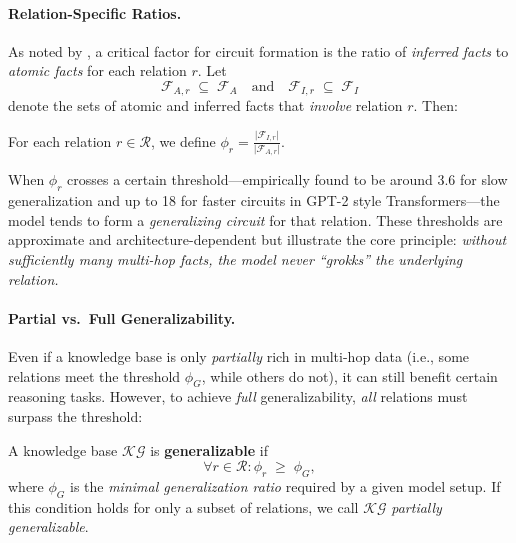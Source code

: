         \paragraph{Relation-Specific Ratios.}
            As noted by \citet{wang_grokked_2024}, a critical factor for circuit formation is the ratio of \emph{inferred facts} to \emph{atomic facts} for each relation \(r\). Let
            \[
                \mathcal{F}_{A,r} \;\subseteq\;\mathcal{F}_A
                \quad\text{and}\quad
                \mathcal{F}_{I,r}\;\subseteq\;\mathcal{F}_I
            \]
            denote the sets of atomic and inferred facts that \emph{involve} relation \(r\). Then:
            
            \begin{definition}
                \label{def:phi_r}
                For each relation \(r\in\mathcal{R}\), we define
                \(\phi_r = \frac{\bigl|\mathcal{F}_{I,r}\bigr|}{\bigl|\mathcal{F}_{A,r}\bigr|}\).
            \end{definition}
            
            When \(\phi_r\) crosses a certain threshold---empirically found to be around 3.6 for slow generalization and up to 18 for faster circuits in GPT-2 style Transformers---the model tends to form a \emph{generalizing circuit} for that relation\citep{power2022grokking}. These thresholds are approximate and architecture-dependent \citep{nanda2023progress,wang_grokked_2024} but illustrate the core principle: \emph{without sufficiently many multi-hop facts, the model never “grokks” the underlying relation.}
            
        \paragraph{Partial vs.\ Full Generalizability.}
            Even if a knowledge base is only \emph{partially} rich in multi-hop data (i.e., some relations meet the threshold \(\phi_G\), while others do not), it can still benefit certain reasoning tasks. However, to achieve \emph{full} generalizability, \emph{all} relations must surpass the threshold:
            \begin{definition}
                \label{def:generalizable_kb}
                A knowledge base \(\mathcal{KG}\) is \textbf{generalizable} if
                \[
                    \forall r \in \mathcal{R}\colon \phi_r \;\ge\; \phi_G,
                \]
                where \(\phi_G\) is the \emph{minimal generalization ratio} required by a given model setup. If this condition holds for only a subset of relations, we call \(\mathcal{KG}\) \emph{partially generalizable}.
            \end{definition}
    
